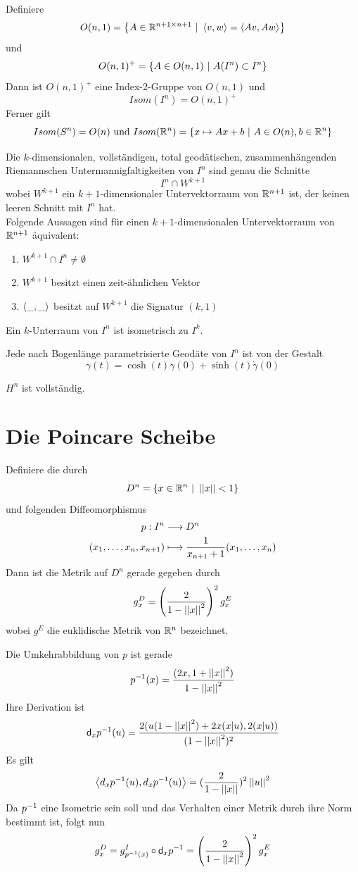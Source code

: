 \documentclass{book}
\renewcommand{\d}{\textsf{d}}
\begin{document}
\Lem{}
Definiere
\[ O(n,1) = \set{A \in \R^{n+1\times n + 1}}{ \shrp{v,w} = \shrp{Av, Aw} }\]
und
\[ O(n,1)^+ = \set{A \in O(n,1)}{A (I^n) \subset I^n } \]
Dann ist $O(n,1)^+$ eine Index-2-Gruppe von $O(n,1)$ und
\[ Isom(I^n) = O(n,1)^+ \]
Ferner gilt
\[ Isom(S^n) = O(n) \text{ und } Isom(\R^n) = \set{x\mapsto Ax + b}{A \in O(n), b\in \R^n } \]


\Prop{}
Die $k$-dimensionalen, vollständigen, total geodätischen, zusammenhängenden Riemannschen Untermannigfaltigkeiten von $I^n$ sind genau die Schnitte
\[ I^n \cap W^{k+1}\]
wobei $W^{k+1}$ ein $k+1$-dimensionaler Untervektorraum von $\mathbb{R}^{n+1}$ ist, der keinen leeren Schnitt mit $I^n$ hat.\\
Folgende Aussagen sind für einen $k+1$-dimensionalen Untervektorraum von $\mathbb{R}^{n+1}$ äquivalent:
\begin{enumerate}[]
	\item $W^{k+1}\cap I^n \neq \emptyset$
	\item $W^{k+1}$ besitzt einen zeit-ähnlichen Vektor
	\item $\left<\_,\_\right>$ besitzt auf $W^{k+1}$ die Signatur $(k,1)$
\end{enumerate}

\Bem{}
Ein $k$-Unterraum von $I^n$ ist isometrisch zu $I^k$.

\Prop{}
Jede nach Bogenlänge parametrisierte Geodäte von $I^n$ ist von der Gestalt
\[ \gamma(t) = \cosh(t) \gamma(0) + \sinh(t)\dot{\gamma}(0) \]

\Kor{}
$H^n$ ist vollständig.

\section{Die Poincare Scheibe}
Definiere die  durch
\[D^n = \set{x \in \R^n}{\norm{x} < 1} \]
und folgenden Diffeomorphismus
\begin{align*}
p : I^n & \overset{}{\longrightarrow} D^n\\
(x_1, \ldots, x_n, x_{n+1}) & \longmapsto \frac{1}{x_{n+1} + 1} (x_1,\ldots, x_n) 
\end{align*}
Dann ist die Metrik auf $D^n$ gerade gegeben durch
\[ g^D_x = \left(\frac{2}{1 - \left|\left|x\right|\right|^2}\right)^2g^E_x \]
wobei $g^E$ die euklidische Metrik von $\mathbb{R}^n$ bezeichnet.
\begin{Beweis}{}
	Die Umkehrabbildung von $p$ ist gerade
	\[ p^{-1}(x) = \frac{(2x, 1 + \left|\left|x\right|\right|^2)}{1 - \left|\left|x\right|\right|^2} \]
	Ihre Derivation ist
	\[ \d_xp\i(u) = \frac{ 2 (u (1 - \norm{x}^2) + 2 x(x|u), 2 (x|u) )}{ (1 - \norm{x}^2)^2 } \]
	Es gilt
	\[ \left<d_xp^{-1}(u), d_xp^{-1}(u)\right> = (\frac{2}{1 - \left|\left|x\right|\right|})^2 \left|\left|u\right|\right|^2 \]
	Da $p^{-1}$ eine Isometrie sein soll und das Verhalten einer Metrik durch ihre Norm bestimmt ist, folgt nun
	\[ g^D_x = g^I_{p\i(x)} \circ \d_xp\i  = \klam{\frac{2}{1 - \norm{x}^2}}^2g^E_x \]
\end{Beweis}
\end{document}
